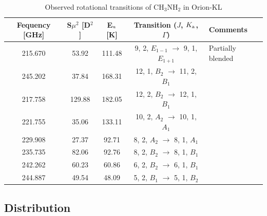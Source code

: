\begin{table}[htb]
\begin{center}

  \caption{Observed rotational transitions of CH$_3$NH$_2$ in Orion-KL}
  \label{tab1}
{\scriptsize
  \begin{tabular}{|c|c|c|c|l|} \hline
   Fequency [GHz]& S$\mu ^{2}$ [D$^2$] & E$_{\rm{u}}$ [K]& Transition ($J$, $K_{\rm{a}}$, $\Gamma$) & Comments \\ \hline 
    215.670 & 53.92 & 111.48 & 9, 2, $E_{1-1}$ $\rightarrow$ 9, 1, $E_{1+1}$ & Partially blended \\
    245.202 & 37.84 & 168.31 & 12, 1, $B_{2}$ $\rightarrow$ 11, 2, $B_{1}$ &  \\
    217.758 & 129.88 & 182.05 & 12, 2, $B_{2}$ $\rightarrow$ 12, 1, $B_{1}$ & \\
    221.755 & 35.06 & 133.11 & 10, 2, $A_{2}$ $\rightarrow$ 10, 1, $A_{1}$ & \\
    229.908 & 27.37 & 92.71 & 8, 2, $A_{2}$ $\rightarrow$ 8, 1, $A_{1}$ & \\ 
    235.735 & 82.06 & 92.76 & 8, 2, $B_{2}$ $\rightarrow$ 8, 1, $B_{1}$ & \\
    242.262 & 60.23 & 60.86 & 6, 2, $B_{2}$ $\rightarrow$ 6, 1, $B_{1}$ & \\
    244.887 & 49.54 & 48.09 & 5, 2, $B_{1}$ $\rightarrow$ 5, 1, $B_{2}$ & \\ \hline
  \end{tabular}
  }
\end{center}
\end{table}

\subsection{Distribution}

